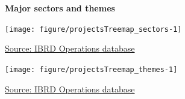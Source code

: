 \documentclass{article}\usepackage[]{graphicx}\usepackage[]{color}
\begin{document}
 \newpage
\begin{minipage}[t]{0.99\textwidth}
\raggedright{\color{white!30!blue} \textbf{\large Major sectors and themes}}
     \vspace*{0.5cm}
     
  \begin{minipage}[c]{0.49\textwidth} %
    \vspace*{0.4cm}


{\centering \texttt{[image: figure/projectsTreemap\_sectors-1]} 

}



    \hspace*{0.3cm} \raggedright\footnotesize{\href{http://www.weforum.org/reports/global-competitiveness-report-2015-2016}{Source: IBRD Operations database}}
  \end{minipage}
  \begin{minipage}[c]{0.49\textwidth} %
    \vspace*{0.4cm}


{\centering \texttt{[image: figure/projectsTreemap\_themes-1]} 

}



  \raggedright{\footnotesize{\href{http://lpi.worldbank.org}{Source: IBRD Operations database}}}
  \end{minipage}
\end{minipage}  
 
\end{document}
